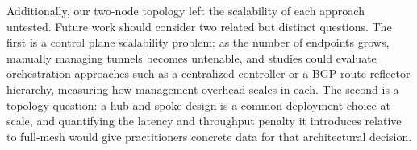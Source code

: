 \documentclass[conference]{IEEEtran}
\begin{document}
Additionally, our two-node topology left the scalability of each approach untested. Future work should consider two related but distinct questions. The first is a control plane scalability problem: as the number of endpoints grows, manually managing tunnels becomes untenable, and studies could evaluate orchestration approaches such as a centralized controller or a BGP route reflector hierarchy, measuring how management overhead scales in each. The second is a topology question: a hub-and-spoke design is a common deployment choice at scale, and quantifying the latency and throughput penalty it introduces relative to full-mesh would give practitioners concrete data for that architectural decision.



\end{document}
